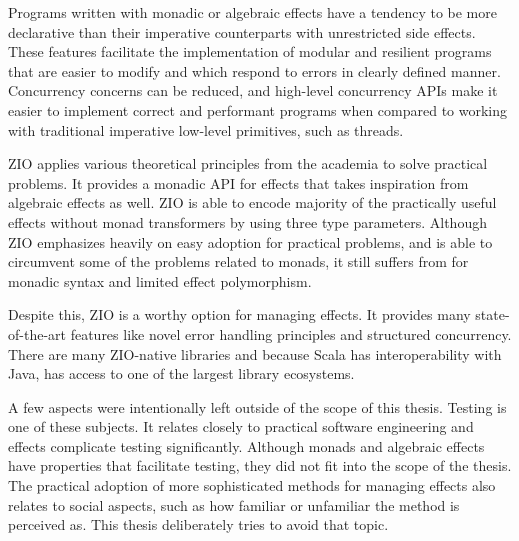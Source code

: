 Programs written with monadic or algebraic effects have a tendency to be more declarative than their imperative counterparts with unrestricted side effects. These features facilitate the implementation of modular and resilient programs that are easier to modify and  which respond to errors in clearly defined manner. Concurrency concerns can be reduced, and high-level concurrency APIs make it easier to implement correct and performant programs when compared to working with traditional imperative low-level primitives, such as threads.

ZIO applies various theoretical principles from the academia to solve practical problems. It provides a monadic API for effects that takes inspiration from algebraic effects as well. ZIO is able to encode majority of the practically useful effects without monad transformers by using three type parameters. Although ZIO emphasizes heavily on easy adoption for practical problems, and is able to circumvent some of the problems related to monads, it still suffers from for monadic syntax and limited effect polymorphism.

Despite this, ZIO is a worthy option for managing effects. It provides many state-of-the-art features like novel error handling principles and structured concurrency.  There are many ZIO-native libraries and because Scala has interoperability with Java, has access to one of the largest library ecosystems.


 
A few aspects were intentionally left outside of the scope of this thesis. Testing is one of these subjects. It relates closely to practical software engineering and effects complicate testing significantly. Although monads and algebraic effects have properties that facilitate testing, they did not fit into the scope of the thesis. The practical adoption of more sophisticated methods for managing effects also relates to social aspects, such as how familiar or unfamiliar the method is perceived as. This thesis deliberately tries to avoid that topic. 







